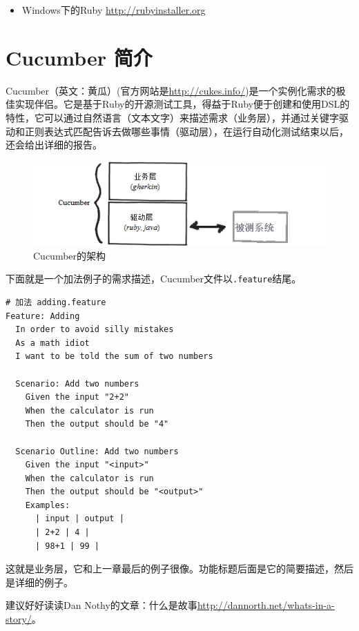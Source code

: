 \begin{itemize}
\item Windows下的Ruby \href{http://rubyinstaller.org}{http:/\slash rubyinstaller.org}

\end{itemize}

\section{Cucumber 简介}
\label{cucumber简介}

Cucumber（英文：黄瓜）(官方网站是\href{http://cukes.info/}{http:/\slash cukes.info\slash })是一个实例化需求的极佳实现伴侣。它是基于Ruby的开源测试工具，得益于Ruby便于创建和使用DSL的特性，它可以通过自然语言（文本文字）来描述需求（业务层），并通过关键字驱动和正则表达式匹配告诉去做哪些事情（驱动层），在运行自动化测试结束以后，还会给出详细的报告。

\begin{figure}[htbp]
\centering
\includegraphics[keepaspectratio,width=\textwidth,height=0.75\textheight]{img/18333fig0601-tn.png}
\caption{Cucumber的架构}
\end{figure}

下面就是一个加法例子的需求描述，Cucumber文件以\texttt{.feature}结尾。

\begin{verbatim}
# 加法 adding.feature
Feature: Adding
  In order to avoid silly mistakes
  As a math idiot
  I want to be told the sum of two numbers
  
  Scenario: Add two numbers
    Given the input "2+2"
    When the calculator is run
    Then the output should be "4"

  Scenario Outline: Add two numbers
    Given the input "<input>"
    When the calculator is run
    Then the output should be "<output>"
    Examples:
      | input | output |
      | 2+2 | 4 |
      | 98+1 | 99 |
\end{verbatim}

这就是业务层，它和上一章最后的例子很像。功能标题后面是它的简要描述，然后是详细的例子。

建议好好读读Dan Nothy的文章：什么是故事\href{http://dannorth.net/whats-in-a-story/}{http:/\slash dannorth.net\slash whats-in-a-story\slash }。

